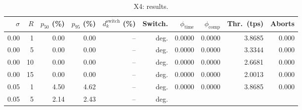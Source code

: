 \begin{table}[!htb]
  \centering
  \captionsetup{format=plain,justification=centering}
  \caption{X4: results.}
  \label{tab:x4-overlap}
  \small
  \setlength{\tabcolsep}{4pt}
  \begin{tabular}{r r r r r r r r r r}
    \toprule
    $\sigma$               & $R$                          & $p_{50}$ (\%) &
    $p_{95}$ (\%)          & $d_k^{\mathrm{switch}}$ (\%) & Switch.       &
    $\phi_{\mathrm{time}}$ & $\phi_{\mathrm{comp}}$       & Thr.\ (tps)   &
    Aborts                                                                           \\
    \midrule
    0.00                   & 1                            & 0.00          & 0.00
                           & --                           & deg.          &
    0.0000                 & 0.0000                       & 3.8685        &
    0.000                                                                            \\
    0.00                   & 5                            & 0.00          & 0.00
                           & --                           & deg.          &
    0.0000                 & 0.0000                       & 3.3344        &
    0.000                                                                            \\
    0.00                   & 10                           & 0.00          & 0.00
                           & --                           & deg.          &
    0.0000                 & 0.0000                       & 2.6681        &
    0.000                                                                            \\
    0.00                   & 15                           & 0.00          & 0.00
                           & --                           & deg.          &
    0.0000                 & 0.0000                       & 2.0013        &
    0.000                                                                            \\
    \midrule
    0.05                   & 1                            & 4.50          & 4.62
                           & --                           & deg.          &
    0.0000                 & 0.0000                       & 3.8685        &
    0.000                                                                            \\
    0.05                   & 5                            & 2.14          & 2.43
                           & --                           & deg.          &

\end{tabular}
\end{table}
